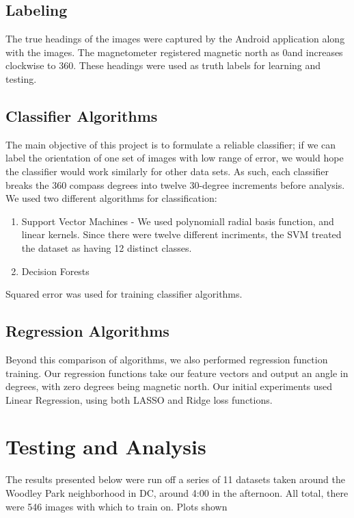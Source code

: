 \documentclass{article}
\begin{document}
\subsection{Labeling}
The true headings of the images were captured by the Android application along with the images. The magnetometer  registered magnetic north as 0\degrees and increases clockwise to 360\degrees. These headings were used as truth labels for learning and testing.

\subsection{Classifier Algorithms}
The main objective of this project is to formulate a reliable classifier; if we can label the orientation of one set of images with low range of error, we would hope the classifier would work similarly for other data sets. As such, each classifier breaks the 360 compass degrees into twelve 30-degree increments before analysis. We used two different algorithms for classification: 
\begin{enumerate}[1.]
\item Support Vector Machines - We used polynomiall radial basis function, and linear kernels. Since there were twelve different incriments, the SVM treated the dataset as having 12 distinct classes. 
\item Decision Forests
\end{enumerate}
Squared error was used for training classifier algorithms.

\subsection{Regression Algorithms}
Beyond this comparison of algorithms, we also performed regression function training. Our regression functions take our feature vectors and output an angle in degrees, with zero degrees being magnetic north. Our initial experiments used Linear Regression, using both LASSO and Ridge loss functions. 

\section{Testing and Analysis}

The results presented below were run off a series of 11 datasets taken around the Woodley Park neighborhood in DC, around 4:00 in the afternoon. All total, there were 546 images with which to train on. Plots shown 
\end{document}
